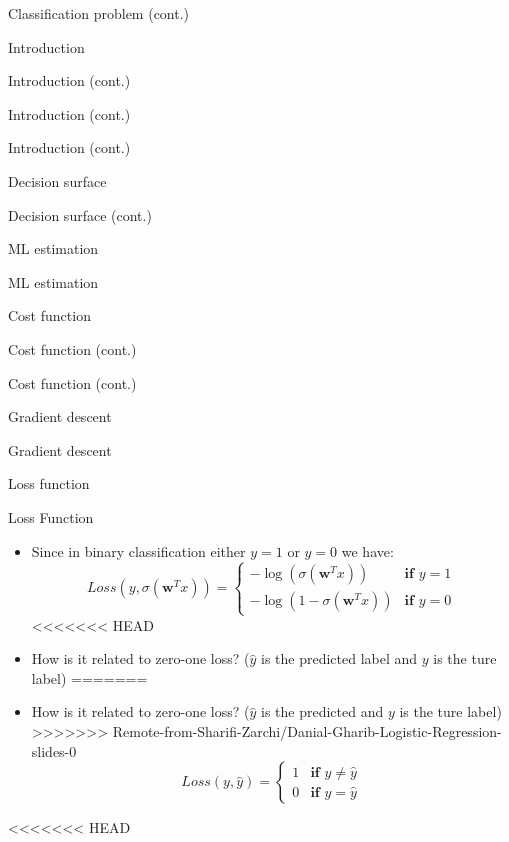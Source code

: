 \documentclass[serif, aspectratio=169]{beamer}
\begin{document}
\begin{frame}{Classification problem (cont.)}
\begin{itemize}
\begin{frame}{Introduction}
\begin{itemize}
\begin{frame}{Introduction (cont.)}
\begin{frame}{Introduction (cont.)}
\begin{frame}{Introduction (cont.)}
\begin{frame}{Decision surface}
\begin{itemize}
\begin{frame}{Decision surface (cont.)}
\begin{frame}{ML estimation}
\begin{frame}{ML estimation}
\begin{itemize}
\begin{frame}{Cost function}
\begin{frame}{Cost function (cont.)}
\begin{itemize}
\begin{itemize}
\begin{frame}{Cost function (cont.)}
\begin{frame}{Gradient descent}
\begin{frame}{Gradient descent}
\begin{frame}{Loss function}
\begin{frame}{Loss Function}
\begin{itemize}
        \item Since in binary classification either $y=1$ or $y=0$ we have:
            \[
                Loss(y, \sigma (\mathbf{w}^T x)) = \begin{cases}
                    - \log (\sigma (\mathbf{w}^T x)) & \textbf{if } y = 1 \\
                    - \log (1 - \sigma (\mathbf{w}^T x)) & \textbf{if } y = 0
                \end{cases}
            \]
<<<<<<< HEAD
        \item How is it related to zero-one loss? ($\hat{y}$ is the predicted label and $y$ is the ture label)
=======
        \item How is it related to zero-one loss? ($\hat{y}$ is the predicted and $y$ is the ture label)
>>>>>>> Remote-from-Sharifi-Zarchi/Danial-Gharib-Logistic-Regression-slides-0
           \[
               Loss(y, \hat{y}) =  \begin{cases}
                    1 & \textbf{if } y \neq \hat{y} \\
                    0 & \textbf{if } y = \hat{y}
                \end{cases}
            \]
    \end{itemize}
\end{frame}

<<<<<<< HEAD


\end{frame}
\end{frame}
\end{frame}
\end{frame}
\end{itemize}
\end{itemize}
\end{frame}
\end{frame}
\end{itemize}
\end{frame}
\end{frame}
\end{frame}
\end{itemize}
\end{frame}
\end{frame}
\end{frame}
\end{frame}
\end{itemize}
\end{frame}
\end{itemize}
\end{frame}
\end{document}
